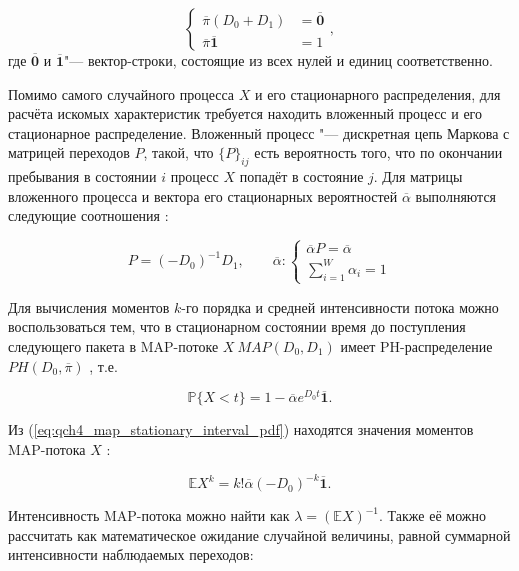 \begin{equation}
	\label{eq:ch4_map_pdf}
	\begin{cases}
		\overline{\pi}(D_0 + D_1) &= \overline{\mathbf{0}}\\
		\overline{\pi}\overline{\mathbf{1}} &= 1
	\end{cases},
\end{equation}
где $\overline{\mathbf{0}}$ и $\overline{\mathbf{1}}$"--- вектор-строки, состоящие из всех нулей и единиц соответственно.

Помимо самого случайного процесса $X$ и его стационарного распределения, для расчёта искомых характеристик требуется находить вложенный процесс и его стационарное распределение. Вложенный процесс "--- дискретная цепь Маркова с матрицей переходов $P$, такой, что $\{P\}_{ij}$ есть вероятность того, что по окончании пребывания в состоянии $i$ процесс $X$ попадёт в состояние $j$. Для матрицы вложенного процесса и вектора его стационарных вероятностей $\overline{\alpha}$ выполняются следующие соотношения \cite{Horvath2005}:

\begin{equation}
\label{eq:ch4_map_embedded_process}
	P = (-D_0)^{-1} D_1, \qquad
	\overline{\alpha}: \begin{cases}
		\overline{\alpha} P = \overline{\alpha} \\
		\sum\limits_{i=1}^{W} \alpha_i = 1
 	\end{cases}
\end{equation}

Для вычисления моментов $k$-го порядка и средней интенсивности потока можно воспользоваться тем, что в стационарном состоянии время до поступления следующего пакета в MAP-потоке $X~MAP(D_0, D_1)$ имеет PH-распределение $PH(D_0, \overline{\pi})$ \cite{Horvath2005}, т.е.

\begin{equation}
	\label{eq:ch4_map_stationary_interval_pdf}
	\mathbb{P}\{X < t\} = 1 - \overline{\alpha}e^{D_0 t}\overline{\mathbf{1}}.
\end{equation}

Из (\ref{eq:qch4_map_stationary_interval_pdf}) находятся значения моментов MAP-потока $X$ \cite{Horvath2005}:

\begin{equation}
	\label{eq:ch4_map_moments}
	\mathbb{E}X^{k} = k! \overline{\alpha}(-D_0)^{-k}\overline{\mathbf{1}}.
\end{equation}

Интенсивность MAP-потока можно найти как $\lambda = (\mathbb{E}X)^{-1}$. Также её можно рассчитать как математическое ожидание случайной величины, равной суммарной интенсивности наблюдаемых переходов:

